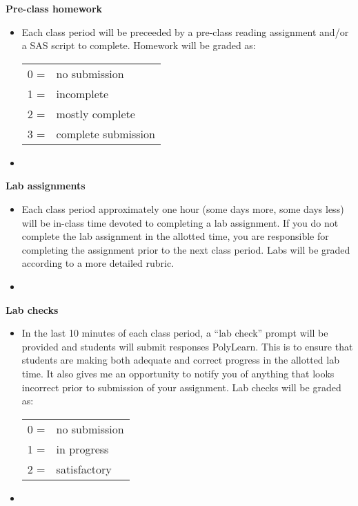 \documentclass[letterpaper,12pt]{report}
\begin{document}
\clearpage
\textbf{Pre-class homework}
\begin{itemize}
\item[]
Each class period will be preceeded by a pre-class reading assignment and/or a SAS script to complete.  Homework will be graded as: \\
\begin{tabular}{ll}
0 = & no submission \\
1 = & incomplete \\
2 = & mostly complete \\
3 = & complete submission \\
\end{tabular}
\item[]
\end{itemize}

\textbf{Lab assignments}
\begin{itemize}
\item[]
Each class period approximately one hour (some days more, some days less) will be in-class time devoted to completing a lab assignment.  If you do not complete the lab assignment in the allotted time, you are responsible for completing the assignment prior to the next class period.  Labs will be graded according to a more detailed rubric.
\item[]
\end{itemize}

\textbf{Lab checks}
\begin{itemize}
\item[]
In the last 10 minutes of each class period, a ``lab check'' prompt will be provided and students will submit responses PolyLearn.  This is to ensure that students are making both adequate and correct progress in the allotted lab time.  It also gives me an opportunity to notify you of anything that looks incorrect prior to submission of your assignment.  Lab checks will be graded as: \\
\begin{tabular}{ll}
0 = & no submission \\
1 = & in progress \\
2 = & satisfactory \\
\end{tabular}
\item[]
\end{itemize}


\end{document}

